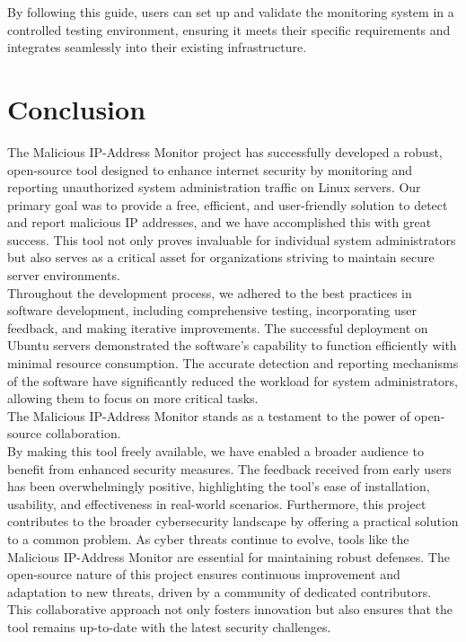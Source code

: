 \documentclass{article}
\begin{document}
    \noindent By following this guide, users can set up and validate the monitoring system in a controlled testing environment, ensuring it meets their specific requirements and integrates seamlessly into their existing infrastructure.

    \newpage
    \section{Conclusion}\label{sec:Conclusion}
    The Malicious IP-Address Monitor project has successfully developed a robust, open-source tool designed to enhance internet security by monitoring and reporting unauthorized system administration traffic on Linux servers.
    Our primary goal was to provide a free, efficient, and user-friendly solution to detect and report malicious IP addresses, and we have accomplished this with great success.
    This tool not only proves invaluable for individual system administrators but also serves as a critical asset for organizations striving to maintain secure server environments.\\

    \noindent Throughout the development process, we adhered to the best practices in software development, including comprehensive testing, incorporating user feedback, and making iterative improvements.
    The successful deployment on Ubuntu servers demonstrated the software's capability to function efficiently with minimal resource consumption.
    The accurate detection and reporting mechanisms of the software have significantly reduced the workload for system administrators, allowing them to focus on more critical tasks.\\

    \noindent The Malicious IP-Address Monitor stands as a testament to the power of open-source collaboration.\\
    By making this tool freely available, we have enabled a broader audience to benefit from enhanced security measures.
    The feedback received from early users has been overwhelmingly positive, highlighting the tool's ease of installation, usability, and effectiveness in real-world scenarios.
    Furthermore, this project contributes to the broader cybersecurity landscape by offering a practical solution to a common problem.
    As cyber threats continue to evolve, tools like the Malicious IP-Address Monitor are essential for maintaining robust defenses.
    The open-source nature of this project ensures continuous improvement and adaptation to new threats, driven by a community of dedicated contributors.
    This collaborative approach not only fosters innovation but also ensures that the tool remains up-to-date with the latest security challenges.
\end{document}
